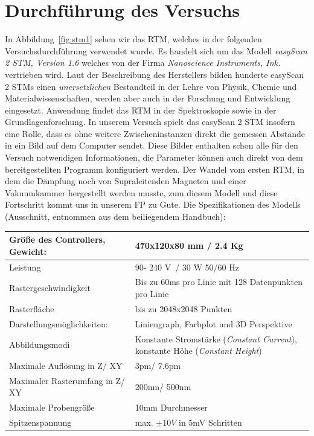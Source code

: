 \section{Durchführung des Versuchs}
In Abbildung~\ref{fig:stm1} sehen wir das RTM, welches in der
folgenden Versuchsdurchführung verwendet wurde. Es handelt sich
um das Modell \textit{easyScan 2 STM, Version 1.6} welches von 
der Firma \textit{Nanoscience Instruments, Ink.} vertrieben wird.
Laut der Beschreibung des Herstellers 
bilden hunderte {easyScan 2 STMs} einen
\textit{unersetzlichen} Bestandteil in der Lehre von Physik,
Chemie und Materialwissenschaften, werden aber auch in der
Forschung und Entwicklung eingesetzt. Anwendung findet das RTM
in der Spektroskopie sowie in der Grundlagenforschung.
In unserem Versuch spielt das easyScan 2 STM insofern eine Rolle,
dass es ohne weitere Zwischeninstanzen direkt die gemessen
Abstände in ein Bild auf dem Computer sendet. Diese Bilder
enthalten schon alle für den Versuch notwendigen Informationen,
die Parameter können auch direkt von dem bereitgestellten Programm
konfiguriert werden. Der Wandel vom ersten RTM, in dem die Dämpfung
noch von Supraleitenden Magneten und einer Vakuumkammer hergestellt
werden musste, zum diesem Modell und diese Fortschritt kommt uns
in unserem FP zu Gute. Die Spezifikationen des Modells 
(Ausschnitt, entnommen aus dem beiliegendem Handbuch):\\
\noindent

\begin{tabular}{| l | p{7cm} |}
\hline
  Größe des Controllers, Gewicht: & 470x120x80 mm / 2.4 Kg\\ \hline
  Leistung & 90- 240 V~/ 30 W 50/60 Hz \\ \hline
  Rastergeschwindigkeit & Bis zu 60ms pro Linie mit 128 Datenpunkten  pro Linie \\ \hline
Rasterfläche & bis zu 2048x2048 Punkten \\ \hline 
Darstellungsmöglichkeiten: & Liniengraph, Farbplot und 3D Perspektive \\ \hline
Abbildungsmodi & Konstante Stromstärke (\textit{Constant Current}),
konstante Höhe (\textit{Constant Height}) \\ \hline
Maximale Auflösung in Z/ XY & 3pm/ 7.6pm \\ \hline
Maximaler Rasterumfang in Z/ XY & 200nm/ 500nm  \\ \hline
Maximale Probengröße & 10mm Durchmesser \\ \hline
Spitzenspannung & max. $\pm 10V$ in 5mV Schritten \\ \hline
\end{tabular}

